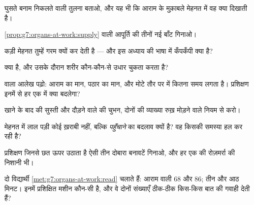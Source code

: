 \begin{exercise}[$\star$]\label{exo:g7:organs-at-work:3}
घुसते बनाम निकलते  वाली तुलना बताओ, और यह भी कि आराम के मुक़ाबले
मेहनत में वह क्या दिखाती है।
\end{exercise}

\begin{exercise}[$\star$]\label{exo:g7:organs-at-work:4}
\cref{prop:g7:organs-at-work:supply} वाली आपूर्ति की तीनों नई बाँट
गिनाओ।
\end{exercise}

\begin{exercise}[$\star$]\label{exo:g7:organs-at-work:5}
कड़ी मेहनत तुम्हें गरम क्यों कर देती है --- और इस अध्याय की भाषा में
कँपकँपी क्या है?
\end{exercise}

\begin{exercise}[$\star$]\label{exo:g7:organs-at-work:6}
 क्या है, और उसके दौरान शरीर कौन-कौन-से उधार चुकता करता है?
\end{exercise}

\begin{exercise}[$\star\star$]\label{exo:g7:organs-at-work:7}
 वाला आलेख पढ़ो: आराम का मान, पठार का मान, और मोटे तौर पर 
में कितना समय लगता है। प्रशिक्षण इनमें से हर एक में क्या बदलेगा?
\end{exercise}

\begin{exercise}[$\star\star$]\label{exo:g7:organs-at-work:8}
खाने के बाद की सुस्ती और दौड़ने वाले की चुभन, दोनों की व्याख्या रुख़
मोड़ने वाले नियम से करो।
\end{exercise}

\begin{exercise}[$\star\star$]\label{exo:g7:organs-at-work:9}
मेहनत में लाल पड़ी  कोई ख़राबी नहीं, बल्कि \emph{पहुँचाने} का
बदलाव क्यों है? वह किसकी समस्या हल कर रही है?
\end{exercise}

\begin{exercise}[$\star\star$]\label{exo:g7:organs-at-work:10}
प्रशिक्षण जिनसे छत ऊपर उठाता है ऐसी तीन दोबारा बनावटें गिनाओ, और हर एक
की रोज़मर्रा की निशानी भी।
\end{exercise}

\begin{exercise}[$\star\star$]\label{exo:g7:organs-at-work:11}
दो विद्यार्थी \cref{met:g7:organs-at-work:read} चलाते हैं: आराम वाली
 $68$ और $86$;  तीन और आठ मिनट। इनमें प्रशिक्षित मशीन
कौन-सी है, और वे दोनों संख्याएँ ठीक-ठीक किस-किस बात की गवाही देती हैं?
\end{exercise}

